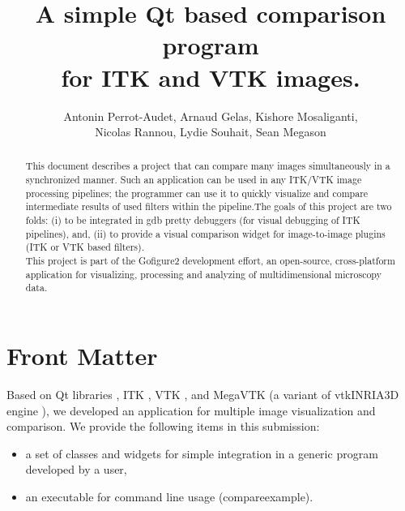 \documentclass{InsightArticle}
\title{A simple Qt based comparison program\\ for ITK and VTK images.}
\author{Antonin Perrot-Audet, Arnaud Gelas, Kishore Mosaliganti,\\ 
Nicolas Rannou, Lydie Souhait, Sean Megason}
\newcommand{\IJhandlerIDnumber}{3196}
\begin{document}
\IJhandlefooter{\IJhandlerIDnumber}


\ifpdf
\else
\fi

\maketitle

\ifhtml
\chapter*{Front Matter\label{front}}
\fi

\begin{abstract}
\noindent
This document describes a project that can compare many images simultaneously in a synchronized manner. Such an application can be used in any ITK/VTK image processing pipelines; the programmer can use it to quickly visualize and compare intermediate results of used filters within the pipeline.The goals of this project are two folds: (i) to be integrated in gdb pretty debuggers \cite{McCornic-VisualDebug}  (for visual debugging of ITK pipelines), and, (ii) to provide a visual comparison widget for image-to-image plugins (ITK or VTK based filters).\\
This project is part of the Gofigure2 \cite{refGofigure2} development effort, an open-source, cross-platform application for visualizing, processing and analyzing of multidimensional microscopy data. 
\end{abstract}

\IJhandlenote{\IJhandlerIDnumber}

\tableofcontents

Based on Qt libraries \cite{refQT}, ITK \cite{ITKSoftwareGuide}, VTK \cite{vtkExamples}, and MegaVTK (a variant of vtkINRIA3D engine \cite{vtkINRIA}), we developed an application for multiple image visualization and comparison.
We provide the following items in this submission:
\begin{itemize}
 \item a set of classes and widgets for simple integration in a generic program developed by a user,
 \item an executable for command line usage (compareexample).
\end{itemize} 
\end{document}
